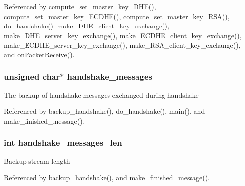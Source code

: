 Referenced by compute\+\_\+set\+\_\+master\+\_\+key\+\_\+\+D\+H\+E(), compute\+\_\+set\+\_\+master\+\_\+key\+\_\+\+E\+C\+D\+H\+E(), compute\+\_\+set\+\_\+master\+\_\+key\+\_\+\+R\+S\+A(), do\+\_\+handshake(), make\+\_\+\+D\+H\+E\+\_\+client\+\_\+key\+\_\+exchange(), make\+\_\+\+D\+H\+E\+\_\+server\+\_\+key\+\_\+exchange(), make\+\_\+\+E\+C\+D\+H\+E\+\_\+client\+\_\+key\+\_\+exchange(), make\+\_\+\+E\+C\+D\+H\+E\+\_\+server\+\_\+key\+\_\+exchange(), make\+\_\+\+R\+S\+A\+\_\+client\+\_\+key\+\_\+exchange(), and on\+Packet\+Receive().

\subsubsection[{\texorpdfstring{handshake\+\_\+messages}{handshake_messages}}]{\setlength{\rightskip}{0pt plus 5cm}unsigned char$\ast$ handshake\+\_\+messages}\hypertarget{struct_t_l_s__parameters__t_ac6734c87e703c22f7d34f71ca116d005}{}\label{struct_t_l_s__parameters__t_ac6734c87e703c22f7d34f71ca116d005}
The backup of handshake messages exchanged during handshake 

Referenced by backup\+\_\+handshake(), do\+\_\+handshake(), main(), and make\+\_\+finished\+\_\+message().

\subsubsection[{\texorpdfstring{handshake\+\_\+messages\+\_\+len}{handshake_messages_len}}]{\setlength{\rightskip}{0pt plus 5cm}int handshake\+\_\+messages\+\_\+len}\hypertarget{struct_t_l_s__parameters__t_afbdbb7d32255aef8951f95ccc44957fc}{}\label{struct_t_l_s__parameters__t_afbdbb7d32255aef8951f95ccc44957fc}
Backup stream length 

Referenced by backup\+\_\+handshake(), and make\+\_\+finished\+\_\+message().

